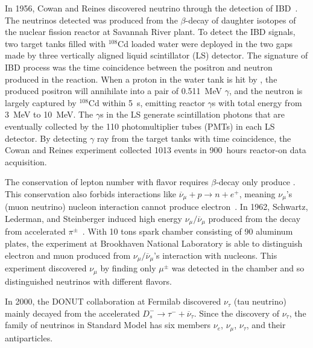     In 1956, Cowan and Reines discovered neutrino through the detection of IBD~\cite{bib:CowanReines}.
    The neutrinos detected was \nuebar produced from the $\beta$-decay of daughter isotopes of the nuclear fission reactor at Savannah River plant.
    To detect the IBD signals, two target tanks filled with $^{108}$Cd loaded water were deployed in the two gaps made by three vertically aligned liquid scintillator (LS) detector.
    The signature of IBD process was the time coincidence between the positron and neutron produced in the reaction.
    When a proton in the water tank is hit by \nuebar, the produced positron will annihilate into a pair of 0.511~MeV $\gamma$, and the neutron is largely captured by $^{108}$Cd within 5~\textmu s, emitting reactor $\gamma$s with total energy from 3~MeV to 10~MeV.
    The $\gamma$s in the LS generate scintillation photons that are eventually collected by the 110 photomultiplier tubes (PMTs) in each LS detector. 
    By detecting $\gamma$ ray from the target tanks with time coincidence, the Cowan and Reines experiment collected 1013 \nuebar events in 900~hours reactor-on data acquisition.
    
    The conservation of lepton number with flavor requires $\beta$-decay only produce \nuebar.
    This conservation also forbids interactions like $\overline{\nu}_\mu + p \rightarrow n + e^+$, meaning ${\nu}_\mu$'s (muon neutrino) nucleon interaction cannot produce electron~\cite{bib:Ponte1959, bib:Schwartz}.
    In 1962, Schwartz, Lederman, and Steinberger induced high energy $\nu_\mu/\overline{\nu}_\mu$ produced from the decay from accelerated $\pi^\pm$~\cite{bib:numuDiscovery}.
    With 10 tons spark chamber consisting of 90 aluminum plates, the experiment at Brookhaven National Laboratory is able to distinguish electron and muon produced from $\nu_\mu/\overline{\nu}_\mu$'s interaction with nucleons. 
    This experiment discovered $\nu_\mu$ by finding only $\mu^\pm$ was detected in the chamber and so distinguished neutrinos with different flavors.
    
    In 2000, the DONUT collaboration at Fermilab discovered $\nu_\tau$ (tau neutrino) mainly decayed from the accelerated $D_s^- \rightarrow \tau^- + \overline{\nu}_\tau$. 
    Since the discovery of $\nu_\tau$, the family of neutrinos in Standard Model has six members $\nu_e$, $\nu_\mu$, $\nu_\tau$, and their antiparticles.
    
    
